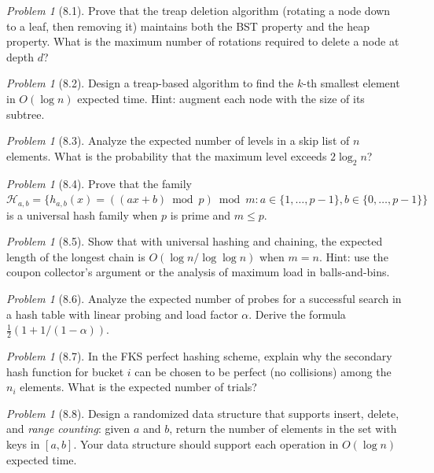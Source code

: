 \documentclass[twoside,12pt]{book}
\theoremstyle{plain}
\theoremstyle{definition}
\theoremstyle{remark}
\newtheorem{problem}[theorem]{Problem}
\begin{document}
\begin{problem}[8.1]
Prove that the treap deletion algorithm (rotating a node down to a leaf, then removing it) maintains both the BST property and the heap property. What is the maximum number of rotations required to delete a node at depth $d$?
\end{problem}

\begin{problem}[8.2]
Design a treap-based algorithm to find the $k$-th smallest element in $O(\log n)$ expected time. Hint: augment each node with the size of its subtree.
\end{problem}

\begin{problem}[8.3]
Analyze the expected number of levels in a skip list of $n$ elements. What is the probability that the maximum level exceeds $2 \log_2 n$?
\end{problem}

\begin{problem}[8.4]
Prove that the family $\mathcal{H}_{a,b} = \{h_{a,b}(x) = ((ax + b) \bmod p) \bmod m : a \in \{1, \ldots, p-1\}, b \in \{0, \ldots, p-1\}\}$ is a universal hash family when $p$ is prime and $m \leq p$.
\end{problem}

\begin{problem}[8.5]
Show that with universal hashing and chaining, the expected length of the longest chain is $O(\log n / \log \log n)$ when $m = n$. Hint: use the coupon collector's argument or the analysis of maximum load in balls-and-bins.
\end{problem}

\begin{problem}[8.6]
Analyze the expected number of probes for a successful search in a hash table with linear probing and load factor $\alpha$. Derive the formula $\frac{1}{2}(1 + 1/(1-\alpha))$.
\end{problem}

\begin{problem}[8.7]
In the FKS perfect hashing scheme, explain why the secondary hash function for bucket $i$ can be chosen to be perfect (no collisions) among the $n_i$ elements. What is the expected number of trials?
\end{problem}

\begin{problem}[8.8]
Design a randomized data structure that supports insert, delete, and \emph{range counting}: given $a$ and $b$, return the number of elements in the set with keys in $[a, b]$. Your data structure should support each operation in $O(\log n)$ expected time.
\end{problem}
\end{document}
